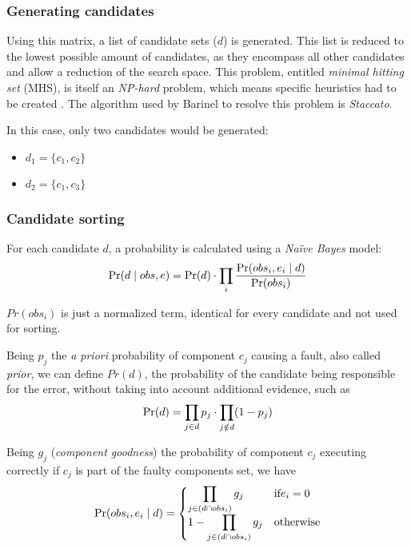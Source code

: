 %
%

\subsubsection{Generating candidates}

Using this matrix, a list of candidate sets ($d$) is generated. This list is reduced to the lowest possible amount of candidates, as they encompass all other candidates and allow a reduction of the search space. This problem, entitled \emph{minimal hitting set} (MHS), is itself an \emph{NP-hard} problem, which means specific heuristics had to be created \cite{RuiAbreu, Cardoso2013}. The algorithm used by Barinel to resolve this problem is \emph{Staccato}.

In this case, only two candidates would be generated:

\begin{itemize}
\item $d_1 = \{c_1, c_2\}$
\item $d_2 = \{c_1, c_3\}$
\end{itemize}

%
%

\subsubsection{Candidate sorting}

For each candidate $d$, a probability is calculated using a \emph{Naïve Bayes} model:
%
\begin{equation}
  \mbox{Pr}(d\mid obs,e) =  \mbox{Pr}(d) \cdot \prod_{i}\frac{\mbox{Pr}(obs_i, e_i \mid d)}{\mbox{Pr}(obs_i)}
\end{equation}


$Pr(obs_i)$ is just a normalized term, identical for every candidate and not used for sorting.

Being $p_j$ the \emph{a priori} probability of component $c_j$ causing a fault, also called \emph{prior}, we can define $Pr(d)$, the probability of the candidate being responsible for the error, without taking into account additional evidence, such as
%
\begin{equation}
  \mbox{Pr}(d) = \prod_{j \in d} p_j \cdot \prod_{j \notin d} (1 - p_j)
\end{equation}


Being $g_j$ (\emph{component goodness}) the probability of component $c_j$ executing correctly if $c_j$ is part of the faulty components set, we have
%
\begin{equation}
  \mbox{Pr}(obs_i, e_i \mid  d) =
  \begin{cases}
    \displaystyle\prod_{j \in (d \cap obs_i)} g_j    & \textrm{if} e_i = 0 \\
  1 - \displaystyle\prod_{j \in (d \cap obs_i)} g_j  & \textrm{otherwise}
  \end{cases}
\end{equation}

